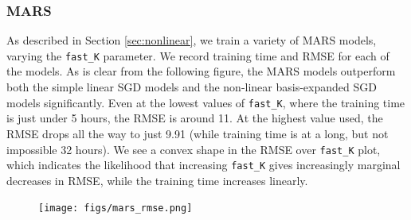 \documentclass[11pt]{article}
\begin{document}
\subsubsection{MARS}
As described in Section \ref{sec:nonlinear}, we train a variety of MARS models, varying the \lstinline{fast_K} parameter.  We record training time and RMSE for each of the models.  As is clear from the following figure, the MARS models outperform both the simple linear SGD models and the non-linear basis-expanded SGD models significantly.  Even at the lowest values of \lstinline{fast_K}, where the training time is just under 5 hours, the RMSE is around 11.  At the highest value used, the RMSE drops all the way to just 9.91 (while training time is at a long, but not impossible 32 hours).  We see a convex shape in the RMSE over \lstinline{fast_K} plot, which indicates the likelihood that increasing \lstinline{fast_K} gives increasingly marginal decreases in RMSE, while the training time increases linearly.
\begin{figure}[H]
\centering
\texttt{[image: figs/mars\_rmse.png]}
\label{fig:mars_rmse}
\end{figure}
\end{document}
